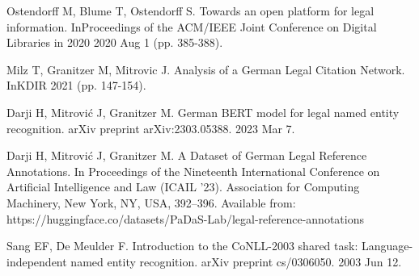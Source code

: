 \documentclass{IOS-Book-Article}
\begin{document}
\begin{thebibliography}{99}
Ostendorff M, Blume T, Ostendorff S. Towards an open platform for legal information. InProceedings of the ACM/IEEE Joint Conference on Digital Libraries in 2020 2020 Aug 1 (pp. 385-388).

Milz T, Granitzer M, Mitrovic J. Analysis of a German Legal Citation Network. InKDIR 2021 (pp. 147-154).

Darji H, Mitrović J, Granitzer M. German BERT model for legal named entity recognition. arXiv preprint arXiv:2303.05388. 2023 Mar 7.

Darji H, Mitrović J, Granitzer M. A Dataset of German Legal Reference Annotations. In Proceedings of the Nineteenth International Conference on Artificial Intelligence and Law (ICAIL '23). Association for Computing Machinery, New York, NY, USA, 392–396. Available from: https://huggingface.co/datasets/PaDaS-Lab/legal-reference-annotations

Sang EF, De Meulder F. Introduction to the CoNLL-2003 shared task: Language-independent named entity recognition. arXiv preprint cs/0306050. 2003 Jun 12.

\end{thebibliography}
\end{document}
